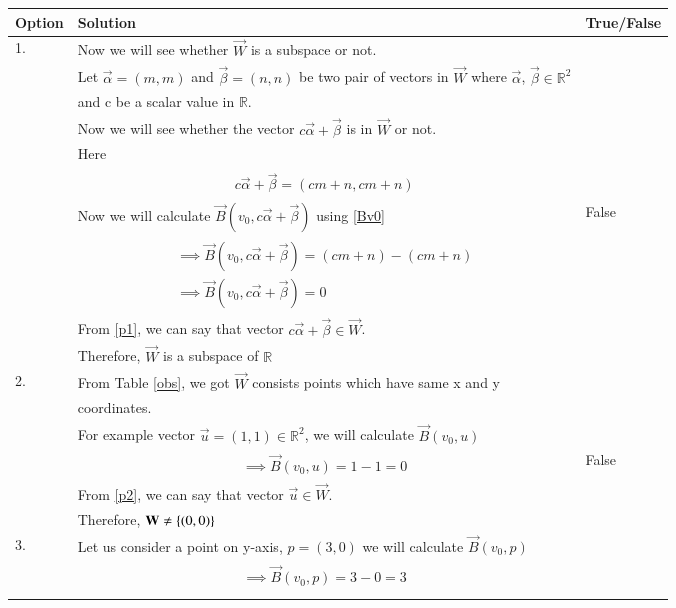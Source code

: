 \documentclass[journal,12pt]{IEEEtran}
\begin{document}
\begin{longtable}{|l|l|l|}
\hline
\endhead
\textbf{Option}&\textbf{Solution}&\textbf{True/False}\\
\hline
1.&Now we will see whether $\vec{W}$ is a subspace or not.&\\&Let $\vec{\alpha}=(m,m)$ and $\vec{\beta}=(n,n)$ be two pair of vectors in $\vec{W}$ where $\vec{\alpha}$, $\vec{\beta}\in\mathbb{R}^2$&\\& and c be a scalar value in $\mathbb{R}$.&\\&Now we will see whether the vector $c\vec{\alpha}+\vec{\beta}$ is in $\vec{W}$ or not.&\\
&Here&\\&\parbox{13cm}{\begin{align}
    c\vec{\alpha}+\vec{\beta}=(cm+n,cm+n)
\end{align}}&\\&Now we will calculate $\vec{B}(v_0,c\vec{\alpha}+\vec{\beta})$ using \eqref{Bv0}&False\\&\parbox{13cm}{\begin{align}
    \implies\vec{B}(v_0,c\vec{\alpha}+\vec{\beta})=(cm+n)-(cm+n)\\
    \implies\vec{B}(v_0,c\vec{\alpha}+\vec{\beta})=0\label{p1}
\end{align}}&\\&From \eqref{p1}, we can say that vector $c\vec{\alpha}+\vec{\beta}\in\vec{W}$.&\\&Therefore, $\vec{W}$ is a subspace of $\mathbb{R}$&\\
.&From Table \ref{obs}, we got $\vec{W}$ consists points which have same x and y &\\&coordinates.&\\&For example vector $\vec{u}=(1,1)\in\mathbb{R}^2$, we will calculate $\vec{B}(v_0,u)$&\\&\parbox{13cm}{\begin{align}
    \implies\vec{B}(v_0,u)=1-1=0\label{p2}
\end{align}}&False\\&From \eqref{p2}, we can say that vector $\vec{u}\in\vec{W}$.&\\&Therefore, $\mathbf{W}\neq\left\{(0,0)\right\}$&\\
.&Let us consider a point on y-axis, $p=(3,0)$ we will calculate $\vec{B}(v_0,p)$&\\&\parbox{13cm}{\begin{align}
    \implies\vec{B}(v_0,p)=3-0=3\\

\end{align}}
\end{longtable}
\end{document}
